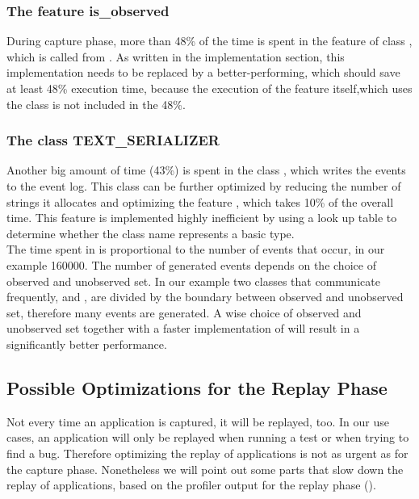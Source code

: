 \subsubsection{The feature is\_observed}
During capture phase, more than 48\% of the time is spent in the feature  of class , which is called from . As written in the implementation section, this implementation needs to be replaced by a better-performing, which should save at least 48\% execution time, because the execution of the feature  itself,which uses the class   is not included in the 48\%.

\subsubsection{The class TEXT\_SERIALIZER}
Another big amount of time (43\%) is spent in the class , which writes the events to the event log. This class can be further optimized by reducing the number of strings it allocates and optimizing the feature , which takes 10\% of the overall time. This feature is implemented highly inefficient by using a look up table to determine whether the class name represents a basic type.\\
The time spent in  is proportional to the number of events that occur, in our example 160000. The number of generated events depends on the choice of observed and unobserved set. In our example two classes that communicate frequently,  and , are divided by the boundary between observed and unobserved set, therefore many events are generated. A wise choice of observed and unobserved set together with a faster implementation of  will result in a significantly better performance.


\subsection {Possible Optimizations for the Replay Phase}
Not every time an application is captured, it will be replayed, too. In our use cases, an application will only be replayed when running a test or when trying to find a bug. Therefore optimizing the replay of applications is not as urgent as for the capture phase. Nonetheless we will point out some parts that slow down the replay of applications, based on the profiler output for the replay phase ().


